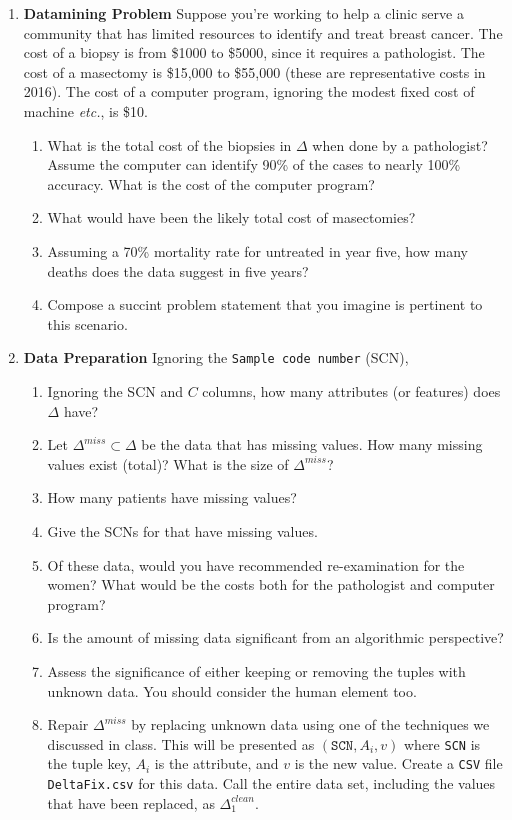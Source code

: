 \documentclass{article}
\begin{document}
\begin{enumerate}\item  {\bf Datamining Problem} Suppose you're working to help a clinic serve a community that has limited resources to identify and treat breast cancer.  The cost of a biopsy is from \$1000 to \$5000, since it requires a pathologist.  The cost of a masectomy is \$15,000 to \$55,000 (these are representative costs in 2016).   The cost of a computer program, ignoring the modest fixed cost of machine {\it etc.}, is \$10.

 \begin{enumerate} \item What is the total cost of the biopsies in $\Delta$ when done by a pathologist?  Assume the computer can identify 90\% of the cases to nearly 100\% accuracy.  What is the cost of the computer program? \item What would have been the likely total cost of masectomies?  \item Assuming a 70\% mortality rate for untreated in year five, how many deaths does the data suggest in five years? \item Compose a succint problem statement that you imagine is pertinent to this scenario. \end{enumerate} \item {\bf Data Preparation} Ignoring the \texttt{Sample code number} (SCN), \begin{enumerate} \item Ignoring the SCN and $C$ columns, how many attributes (or features) does $\Delta$ have? \item Let $\Delta^{miss}\subset \Delta$ be the data that has missing values.  How many missing values exist (total)?  What is the size of $\Delta^{miss}$? \item How many patients have missing values? \item Give the SCNs for that have missing values.  \item Of these data, would you have recommended re-examination for the women?  What would be the costs both for the pathologist and computer program? 
  \item Is the amount of missing data significant from an algorithmic perspective? \item Assess the significance of either keeping or removing the tuples with unknown data. You should consider the human element too.
 \item Repair $\Delta^{miss}$ by replacing unknown data using one of the techniques we discussed in class.  This will be  presented as $(\texttt{SCN}, A_i, v)$ where \texttt{SCN} is the tuple key, $A_i$ is the attribute, and $v$ is the new value.
 Create a \texttt{CSV} file \texttt{DeltaFix.csv} for this data.  Call the entire data set, including the values that have been replaced, as $\Delta_1^{clean}$.
 \end{enumerate} 
 

\end{enumerate}
\end{document}

